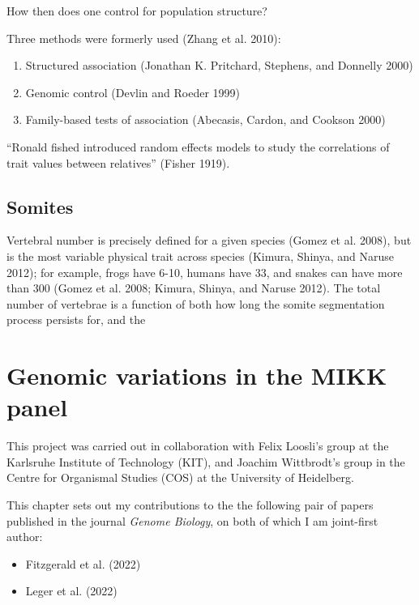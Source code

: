 \documentclass[
]{book}
\begin{document}
How then does one control for population structure?

Three methods were formerly used (Zhang et al. 2010):

\begin{enumerate}
\def\labelenumi{\arabic{enumi}.}
\item
  Structured association (Jonathan K. Pritchard, Stephens, and Donnelly 2000)
\item
  Genomic control (Devlin and Roeder 1999)
\item
  Family-based tests of association (Abecasis, Cardon, and Cookson 2000)
\end{enumerate}

``Ronald fished introduced random effects models to study the correlations of trait values between relatives'' (Fisher 1919).

\hypertarget{somites}{%
\section{Somites}\label{somites}}

Vertebral number is precisely defined for a given species (Gomez et al. 2008), but is the most variable physical trait across species (Kimura, Shinya, and Naruse 2012); for example, frogs have 6-10, humans have 33, and snakes can have more than 300 (Gomez et al. 2008; Kimura, Shinya, and Naruse 2012). The total number of vertebrae is a function of both how long the somite segmentation process persists for, and the

\hypertarget{MIKK-genomes-chap}{%
\chapter{Genomic variations in the MIKK panel}\label{MIKK-genomes-chap}}

This project was carried out in collaboration with Felix Loosli's group at the Karlsruhe Institute of Technology (KIT), and Joachim Wittbrodt's group in the Centre for Organismal Studies (COS) at the University of Heidelberg.

This chapter sets out my contributions to the the following pair of papers published in the journal \emph{Genome Biology}, on both of which I am joint-first author:

\begin{itemize}
\item
  Fitzgerald et al. (2022)
\item
  Leger et al. (2022)
\end{itemize}
\end{document}
